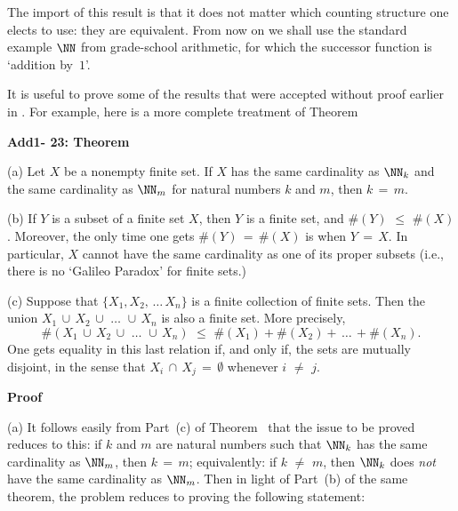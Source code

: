 {        The import of this result is that it does not matter which counting structure one elects to use: they are equivalent.
    From now on we shall use the standard example ${\NN}$ from grade-school arithmetic, for which the successor function is `addition by~$1$'.

\V
\V

        It is useful to prove some of the results that were accepted without proof earlier in {\TheseNotes}.
    For example, here is a more complete treatment of Theorem~


        {\bf Add1- 23: Theorem}

\hspace*{\parindent}(a) Let $X$ be a nonempty finite set. If $X$ has the same cardinality as ${\NN}_{k}$ and the same cardinality as ${\NN}_{m}$ for natural numbers $k$ and $m$, then $k \,=\, m$.

\V

        (b) If $Y$ is a subset of a finite set $X$, then $Y$ is a finite set, and $\#(Y)\,\,{\leq}\,\,\#(X)$.
    Moreover, the only time one gets $\#(Y) \,=\, \#(X)$ is when $Y \,=\, X$.
    In particular, $X$ cannot have the same cardinality as one of its proper subsets (i.e., there is no `Galileo Paradox' for finite sets.)


\V

        (c) Suppose that $\{X_{1},X_{2},\,{\ldots}\,X_{n}\}$ is a finite collection of finite sets.
    Then the union $X_{1}\,{\cup}\,X_{2}\,{\cup}\,\,{\ldots}\,\,{\cup}\,X_{n}$ is also a finite set. More precisely,
        \begin{displaymath}
         \#(X_{1}\,{\cup}\,X_{2}\,{\cup}\,\,{\ldots}\,\,{\cup}\,X_{n})
    \,\,{\leq}\,\,
        \#(X_{1}) + \#(X_{2}) + \,{\ldots}\,+\#(X_{n}).
        \end{displaymath}
    One gets equality in this last relation if, and only if, the sets are mutually disjoint,
    in the sense that $X_{i}\,{\cap}\,X_{j} \,=\, {\emptyset}$ whenever $i \,\,{\neq}\,\, j$.

\V


        {\bf Proof}\, 

\V

        (a) It follows easily from Part~(c) of Theorem~ that the issue to be proved reduces to this:
    if $k$ and $m$ are natural numbers such that ${\NN}_{k}$ has the same cardinality as ${\NN}_{m}$, then $k \,=\, m$;
    equivalently: if $k \,\,{\neq}\,\, m$, then ${\NN}_{k}$ does {\em not} have the same cardinality as ${\NN}_{m}$.
    Then in light of Part~(b) of the same theorem, the problem reduces to proving the following statement:

}
